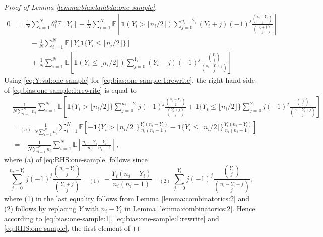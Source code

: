 \documentclass[12pt,letterpaper]{article}
\begin{document}
\begin{proof}[Proof of Lemma \ref{lemma:bias:lambda:one-sample}]
\begin{equation}\label{eq:Y:val:one-sample}
\begin{array}{rl}
0\!\!\!\!&=\displaystyle\frac{1}{N}\sum_{i=1}^N\theta_i^{\mathrm{o}}\mathbb{E}\left[Y_i\right]-\frac{1}{N}\sum_{i=1}^N\mathbb{E}\left[\mathbf{1}(Y_{i} > \lfloor n_i/2\rfloor)\!\!\!\sum_{j=0}^{n_{i}-Y_{i}}(Y_i+j)(-1)^{j}\frac{\binom{n_i-Y_i}{j}}{\binom{Y_i+j}{j}}\right]\\
&\displaystyle\quad\quad-\frac{1}{N}\sum_{i=1}^N\mathbb{E}\left[Y_i\mathbf{1}\{Y_i\leq \lfloor n_i/2\rfloor\}\right]\\
&\displaystyle\quad\quad+\frac{1}{N}\sum_{i=1}^N\mathbb{E}\left[\mathbf{1}(Y_{i}\leq \lfloor n_i/2\rfloor)\sum_{j=0}^{Y_{i}}(Y_i-j)(-1)^{j}\frac{\binom{Y_i}{j}}{\binom{n_i-Y_i+j}{j}}\right]
\end{array}
\end{equation}
Using \eqref{eq:Y:val:one-sample} for \eqref{eq:bias:one-sample:1:rewrite}, the right hand side of \eqref{eq:bias:one-sample:1:rewrite} is equal to
\begin{equation}\label{eq:RHS:one-sample}
\begin{array}{rl}
&\!\!\!\!\!\!\!\!\displaystyle\frac{1}{N\sum_{i=1}^Nn_i}\!\sum_{i=1}^N\!\mathbb{E}\!\!\left[\mathbf{1}\{Y_i>\lfloor n_i/2\rfloor\}\sum_{j=0}^{n_i-Y_i}j(-1)^j\frac{\binom{n_i-Y_i}{j}}{\binom{Y_i+j}{j}}+\mathbf{1}\{Y_{i}\leq \lfloor n_i/2\rfloor\}\sum_{j=0}^{Y_{i}}j(-1)^{j}\frac{\binom{Y_i}{j}}{\binom{n_i-Y_i+j}{j}}\right]\\
&\displaystyle=_{(a)}\frac{1}{N\sum_{i=1}^Nn_i}\sum_{i=1}^N\mathbb{E}\left[-\mathbf{1}\{Y_i>\lfloor n_i/2\rfloor\}\frac{Y_i(n_i-Y_i)}{n_i(n_i-1)}-\mathbf{1}\{Y_{i}\leq \lfloor n_i/2\rfloor\}\frac{Y_i(n_i-Y_i)}{n_i(n_i-1)}\right]\\
&\displaystyle=-\frac{1}{N\sum_{i=1}^Nn_i}\sum_{i=1}^N\mathbb{E}\left[\frac{n_i-Y_i}{n_i}\frac{Y_i}{n_i-1}\right],
\end{array}
\end{equation}
where (a) of \eqref{eq:RHS:one-sample} follows since 
$$\sum_{j=0}^{n_i-Y_i}j(-1)^j\frac{\binom{n_i-Y_i}{j}}{\binom{Y_i+j}{j}}=_{(1)}-\frac{Y_i(n_i-Y_i)}{n_i(n_i-1)}=_{(2)}\sum_{j=0}^{Y_{i}}j(-1)^{j}\frac{\binom{Y_i}{j}}{\binom{n_i-Y_i+j}{j}},$$
where (1) in the last equality follows from Lemma \ref{lemma:combinatorics:2} and (2) follows by replacing $Y$ with $n_i-Y_i$ in Lemma \ref{lemma:combinatorics:2}. Hence according to \eqref{eq:bias:one-sample:1}, \eqref{eq:bias:one-sample:1:rewrite} and \eqref{eq:RHS:one-sample}, the first element of 

\end{proof}
\end{document}
